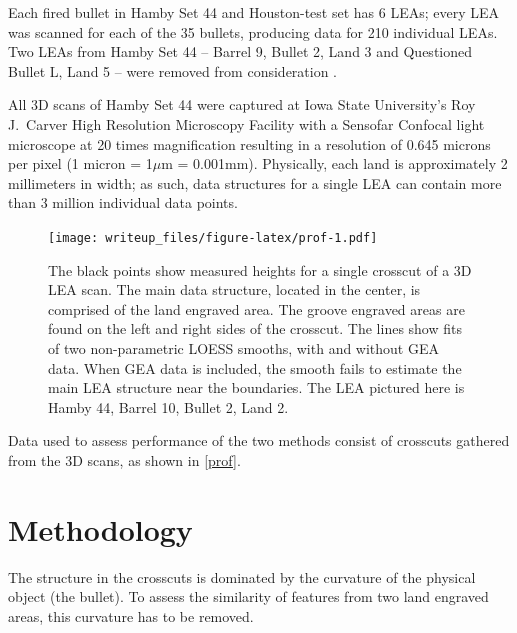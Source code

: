\documentclass[12pt]{article}
\begin{document}
Each fired bullet in Hamby Set 44 and Houston-test set has 6 LEAs; every
LEA was scanned for each of the 35 {\color{teal}{(104)}} bullets,
producing data for 210 {\color{teal}{624}} individual LEAs. Two LEAs
from Hamby Set 44 -- Barrel 9, Bullet 2, Land 3 and Questioned Bullet L,
Land 5 -- were removed from consideration
{\color{teal}{because they were deemed unsuitable for comparison. These two LEAs contained significant abrasians created by contact with the bottom of a water recovery tank after exiting the barrel. These abrasians are thus marks present on the LEAs that are not due to contact with the barrel itself}}.

All 3D scans of Hamby Set 44 {\color{teal}{and Houston-test}} were
captured at Iowa State University's Roy J.~Carver High Resolution
Microscopy Facility with a Sensofar Confocal light microscope at 20
times magnification resulting in a resolution of 0.645 microns per pixel
(1 micron = 1\(\mu\)m = 0.001mm). Physically, each land is approximately
2 millimeters in width; as such, data structures for a single LEA can
contain more than 3 million individual data points.

\begin{figure}
\centering
\texttt{[image: writeup\_files/figure-latex/prof-1.pdf]}
\caption{\label{prof}The black points show measured heights for a single
crosscut of a 3D LEA scan. The main data structure, located in the
center, is comprised of the land engraved area. The groove engraved
areas are found on the left and right sides of the crosscut. The lines
show fits of two non-parametric LOESS smooths, with and without GEA
data. When GEA data is included, the smooth fails to estimate the main
LEA structure near the boundaries. The LEA pictured here is Hamby 44,
Barrel 10, Bullet 2, Land 2.}
\end{figure}

Data used to assess performance of the two methods consist of crosscuts
gathered from the 3D scans, as shown in \autoref{prof}.

\section{Methodology}

The structure in the crosscuts is dominated by the curvature of the
physical object (the bullet). To assess the similarity of features from
two land engraved areas, this curvature has to be removed.
\end{document}
